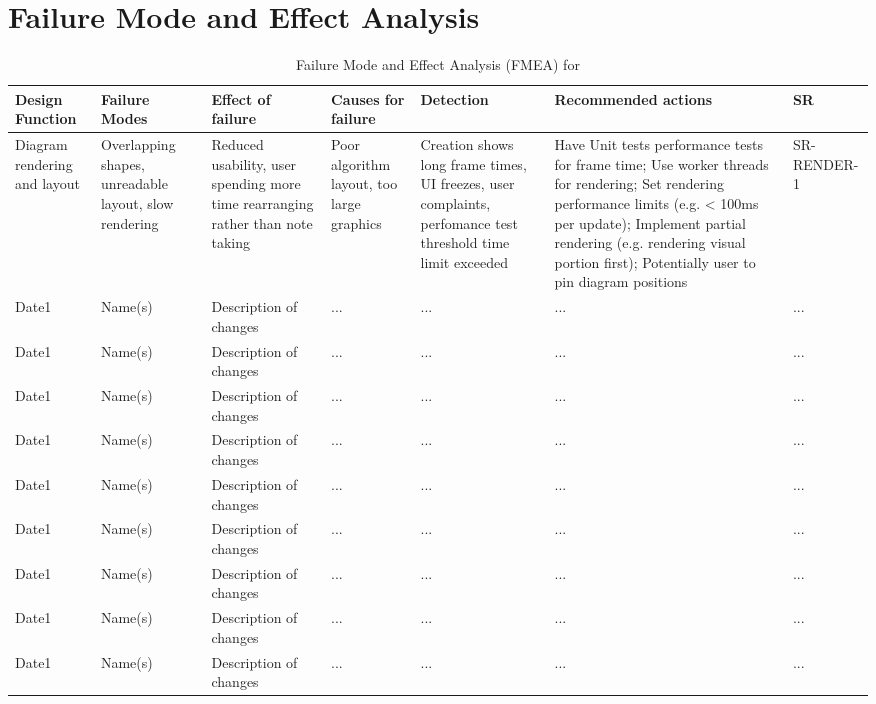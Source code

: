 \documentclass{article}
\begin{document}
\newpage
{}
\recalctypearea

\section{Failure Mode and Effect Analysis}

\begin{table}[htbp]
\centering
\small
\caption{Failure Mode and Effect Analysis (FMEA) for \progname} 
\begin{tabularx}{\textwidth}{X X X X X X X}
\toprule
\textbf{Design Function} & \textbf{Failure Modes} & \textbf{Effect of failure} &
 \textbf{Causes for failure} & \textbf{Detection} & \textbf{Recommended actions} 
 & \textbf{SR}\\
\midrule
Diagram rendering and layout & Overlapping shapes, unreadable layout, slow 
rendering & Reduced usability, user spending more time rearranging rather 
than note taking & Poor algorithm layout, too large graphics & Creation shows
long frame times, UI freezes, user complaints, perfomance test threshold time 
limit exceeded & Have Unit tests performance tests for frame time; Use worker 
threads for rendering; Set rendering performance limits (e.g. < 100ms per 
update); Implement partial rendering (e.g. rendering visual portion first); 
Potentially user to pin diagram positions & SR-RENDER-1 \\
Date1 & Name(s) & Description of changes & ... & ... & ... & ...\\
Date1 & Name(s) & Description of changes & ... & ... & ... & ...\\
Date1 & Name(s) & Description of changes & ... & ... & ... & ...\\
Date1 & Name(s) & Description of changes & ... & ... & ... & ...\\
Date1 & Name(s) & Description of changes & ... & ... & ... & ...\\
Date1 & Name(s) & Description of changes & ... & ... & ... & ...\\
Date1 & Name(s) & Description of changes & ... & ... & ... & ...\\
Date1 & Name(s) & Description of changes & ... & ... & ... & ...\\
Date1 & Name(s) & Description of changes & ... & ... & ... & ...\\
\bottomrule
\end{tabularx}
\end{table}
\end{document}
